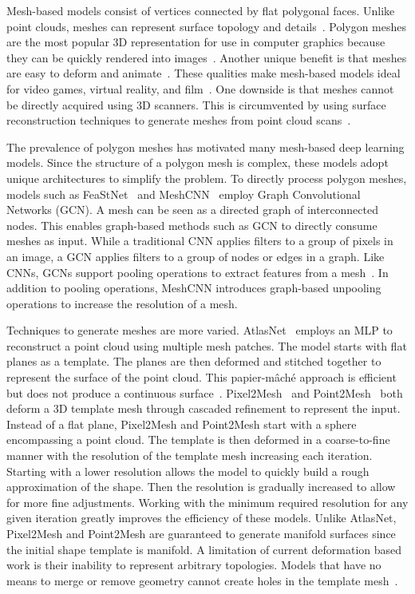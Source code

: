 Mesh-based models consist of vertices connected by flat polygonal faces. Unlike point clouds, meshes can represent surface topology and details~\cite{Xiao2020}. Polygon meshes are the most popular 3D representation for use in computer graphics because they can be quickly rendered into images~\cite{Watt1996}. Another unique benefit is that meshes are easy to deform and animate~\cite{Wang2018}. These qualities make mesh-based models ideal for video games, virtual reality, and film~\cite{Nash2020}. One downside is that meshes cannot be directly acquired using 3D scanners. This is circumvented by using surface reconstruction techniques to generate meshes from point cloud scans~\cite{Yuan2022}.

The prevalence of polygon meshes has motivated many mesh-based deep learning models. Since the structure of a polygon mesh is complex, these models adopt unique architectures to simplify the problem. To directly process polygon meshes, models such as FeaStNet~\cite{Verma2018} and MeshCNN~\cite{Hanocka2019} employ Graph Convolutional Networks (GCN). A mesh can be seen as a directed graph of interconnected nodes. This enables graph-based methods such as GCN to directly consume meshes as input. While a traditional CNN applies filters to a group of pixels in an image, a GCN applies filters to a group of nodes or edges in a graph. Like CNNs, GCNs support pooling operations to extract features from a mesh~\cite{Verma2018}. In addition to pooling operations, MeshCNN introduces graph-based unpooling operations to increase the resolution of a mesh.

Techniques to generate meshes are more varied. AtlasNet~\cite{Groueix2018} employs an MLP to reconstruct a point cloud using multiple mesh patches. The model starts with flat planes as a template. The planes are then deformed and stitched together to represent the surface of the point cloud. This papier-m{\^a}ch{\'e} approach is efficient but does not produce a continuous surface~\cite{Groueix2018}. Pixel2Mesh~\cite{Wang2018} and Point2Mesh~\cite{Hanocka2020} both deform a 3D template mesh through cascaded refinement to represent the input. Instead of a flat plane, Pixel2Mesh and Point2Mesh start with a sphere encompassing a point cloud. The template is then deformed in a coarse-to-fine manner with the resolution of the template mesh increasing each iteration. Starting with a lower resolution allows the model to quickly build a rough approximation of the shape. Then the resolution is gradually increased to allow for more fine adjustments. Working with the minimum required resolution for any given iteration greatly improves the efficiency of these models. Unlike AtlasNet, Pixel2Mesh and Point2Mesh are guaranteed to generate manifold surfaces since the initial shape template is manifold. A limitation of current deformation based work is their inability to represent arbitrary topologies. Models that have no means to merge or remove geometry cannot create holes in the template mesh~\cite{Wang2018, Hanocka2020}.

